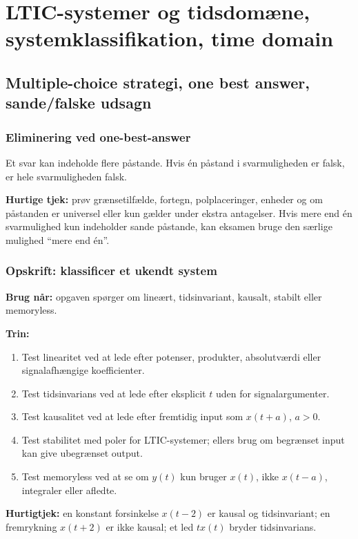 \section{LTIC-systemer og tidsdomæne, systemklassifikation, time domain}

\subsection{Multiple-choice strategi, one best answer, sande/falske udsagn}

\subsubsection{Eliminering ved one-best-answer}
Et svar kan indeholde flere påstande. Hvis én påstand i svarmuligheden er falsk, er hele svarmuligheden falsk.

\textbf{Hurtige tjek:} prøv grænsetilfælde, fortegn, polplaceringer, enheder og om påstanden er universel eller kun gælder under ekstra antagelser. Hvis mere end én svarmulighed kun indeholder sande påstande, kan eksamen bruge den særlige mulighed ``mere end én''.

\subsubsection{Opskrift: klassificer et ukendt system}
\textbf{Brug når:} opgaven spørger om lineært, tidsinvariant, kausalt, stabilt eller memoryless.

\textbf{Trin:}
\begin{enumerate}
    \item Test linearitet ved at lede efter potenser, produkter, absolutværdi eller signalafhængige koefficienter.
    \item Test tidsinvarians ved at lede efter eksplicit \(t\) uden for signalargumenter.
    \item Test kausalitet ved at lede efter fremtidig input som \(x(t+a)\), \(a>0\).
    \item Test stabilitet med poler for LTIC-systemer; ellers brug om begrænset input kan give ubegrænset output.
    \item Test memoryless ved at se om \(y(t)\) kun bruger \(x(t)\), ikke \(x(t-a)\), integraler eller afledte.
\end{enumerate}

\textbf{Hurtigtjek:} en konstant forsinkelse \(x(t-2)\) er kausal og tidsinvariant; en fremrykning \(x(t+2)\) er ikke kausal; et led \(t x(t)\) bryder tidsinvarians.

